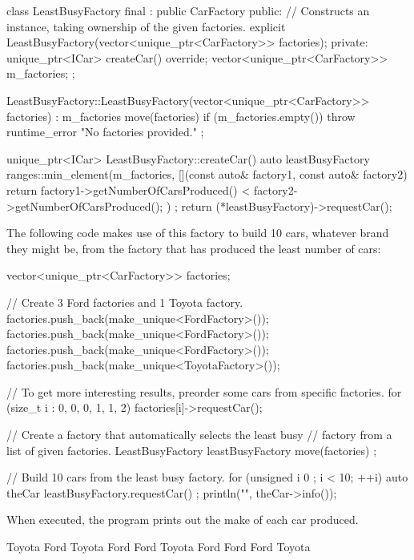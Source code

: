 \begin{cpp}
class LeastBusyFactory final : public CarFactory
{
    public:
        // Constructs an instance, taking ownership of the given factories.
        explicit LeastBusyFactory(vector<unique_ptr<CarFactory>> factories);
    private:
        unique_ptr<ICar> createCar() override;
        vector<unique_ptr<CarFactory>> m_factories;
};

LeastBusyFactory::LeastBusyFactory(vector<unique_ptr<CarFactory>> factories)
    : m_factories { move(factories) }
{
    if (m_factories.empty()) {
        throw runtime_error { "No factories provided." };
    }
}

unique_ptr<ICar> LeastBusyFactory::createCar()
{
    auto leastBusyFactory { ranges::min_element(m_factories,
        [](const auto& factory1, const auto& factory2) {
            return factory1->getNumberOfCarsProduced() <
                factory2->getNumberOfCarsProduced(); }) };
    return (*leastBusyFactory)->requestCar();
}
\end{cpp}

The following code makes use of this factory to build 10 cars, whatever brand they might be, from the factory that has produced the least number of cars:

\begin{cpp}
vector<unique_ptr<CarFactory>> factories;

// Create 3 Ford factories and 1 Toyota factory.
factories.push_back(make_unique<FordFactory>());
factories.push_back(make_unique<FordFactory>());
factories.push_back(make_unique<FordFactory>());
factories.push_back(make_unique<ToyotaFactory>());

// To get more interesting results, preorder some cars from specific factories.
for (size_t i : {0, 0, 0, 1, 1, 2}) { factories[i]->requestCar(); }

// Create a factory that automatically selects the least busy
// factory from a list of given factories.
LeastBusyFactory leastBusyFactory { move(factories) };

// Build 10 cars from the least busy factory.
for (unsigned i { 0 }; i < 10; ++i) {
    auto theCar { leastBusyFactory.requestCar() };
    println("{}", theCar->info());
}
\end{cpp}

When executed, the program prints out the make of each car produced.

\begin{shell}
Toyota
Ford
Toyota
Ford
Ford
Toyota
Ford
Ford
Ford
Toyota
\end{shell}

